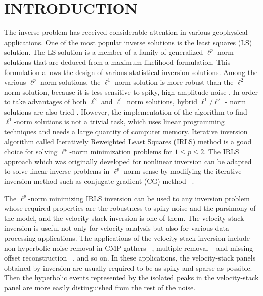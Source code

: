 \section{INTRODUCTION}

The inverse problem has received considerable attention 
in various geophysical applications. 
One of the most popular inverse solutions is the least squares (LS) solution.
The LS solution is a member of a family of generalized 
$\ell^p$-norm solutions that are deduced from a maximum-likelihood formulation.
This formulation allows the design of various statistical inversion solutions.  
Among the various $\ell^p$-norm solutions, 
the $\ell^1$-norm solution is more robust than the $\ell^2$-norm solution, 
because it is less sensitive to spiky, high-amplitude noise 
\cite{GEO38.05.08260844,GEO44-01-00390052,GIT00-00-00250050,SEG-1988-S7.1}.
In order to take advantages of both $\ell^2$ and $\ell^1$ norm solutions, 
hybrid $\ell^1/\ell^2$ - norm solutions are also 
tried \cite{Huber:73,GEO62-04-11831195,GEO68-04-13101319}.
However, the implementation of the algorithm to find
$\ell^1$-norm solutions is not a trivial task, which uses linear programming techniques 
\cite{GEO44-01-00390052} and needs a large quantity of computer memory.
Iterative inversion algorithm called Iteratively Reweighted Least Squares (IRLS) method
\cite{GEO51-02-03570368,GIT00-00-00250050,SEG-1988-S7.1,GEO62-04-11831195} 
is a good choice for solving
$\ell^p$-norm minimization problems for $1\le p \le2$.  
The IRLS approach which was originally developed for nonlinear inversion
can be adapted to solve linear inverse problems in $\ell^p$-norm sense
by modifying the iterative inversion method such as conjugate gradient (CG) method
~\cite{Darche.sep.61.281,Nichols.sep.82.1,Claerbout.iee.www}.

The $\ell^p$-norm minimizing IRLS inversion can be used to any inversion problem 
whose required properties are the robustness to spiky noise and the parsimony of the model,
and the velocity-stack inversion is one of them.
The velocity-stack inversion is useful not only for velocity analysis 
but also for various data processing applications.
The applications of the velocity-stack inversion include
non-hyperbolic noise removal in CMP gathers ~\cite{Nichols.sep.82.1,GEO68-04-13101319}, 
multiple-removal 
~\cite{GEO50.12.27272741,Hampson-22-044055,GEO57-03-03860395,SEG-1995-1464,SEG-1995-1460,TLE18-01-00660073,SEG-2000-19531956}
and missing offset reconstruction ~\cite{Ji.sep.82.195,GEO60-04-11691177},
and so on.
In these applications, the velocity-stack panels obtained 
by inversion are usually required
to be as spiky and sparse as possible.
Then the hyperbolic events represented by the isolated peaks 
in the velocity-stack panel
are more easily distinguished from the rest of the noise.

